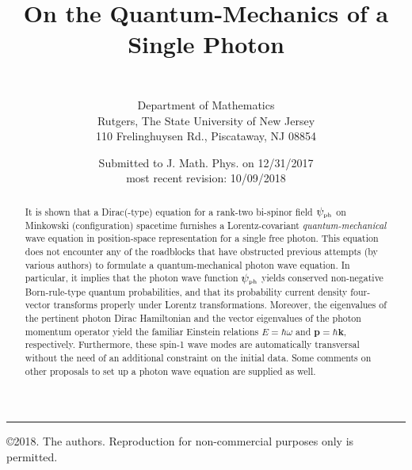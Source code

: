 \documentclass[12pt]{article}
\theoremstyle{definition}
\newcommand{\vect}[1] {\boldsymbol{{ #1}} }
\newcommand{\kV}{{\vect{k}}}		%
\newcommand{\pV}{{\vect{p}}}            %
\numberwithin{equation}{section}
\newcommand{\psiPH}{{\psi_{\mbox{\rm\tiny ph}}}}
\begin{document}
\title{On the Quantum-Mechanics of a Single Photon}

\author{\normalsize{}\\
	{$\phantom{nix}$}\\[-0.1cm] 
        \normalsize Department of Mathematics\\[-0.1cm]
	Rutgers, The State University of New Jersey\\[-0.1cm]
	110 Frelinghuysen Rd., Piscataway, NJ 08854}
\vspace{-0.3cm}
\date{Submitted to J. Math. Phys. on 12/31/2017\\
 most recent revision: 10/09/2018} %
\maketitle
%
%
%
\begin{abstract}
\noindent
 It is shown that a Dirac(-type) equation for a rank-two bi-spinor field $\psiPH$ on Minkowski (configuration) spacetime
furnishes a Lorentz-covariant \emph{quantum-mechanical} wave equation in position-space representation for a single free photon.
 This equation does not encounter any of the roadblocks that have obstructed previous attempts (by various authors) to formulate 
a {quantum-mechanical} photon wave equation.  
 In particular, it implies that the photon wave function $\psiPH$ yields conserved 
non-negative Born-rule-type quantum probabilities,  
and that its probability current density four-vector transforms properly under Lorentz transformations.
 Moreover, the eigenvalues of the pertinent photon Dirac Hamiltonian and the vector eigenvalues of the photon momentum operator 
yield the familiar Einstein relations $E=\hbar\omega$ and $\pV=\hbar\kV$, respectively. 
 Furthermore, these spin-1 wave modes are automatically transversal without the need of an additional constraint on the initial data.
 Some comments on  other proposals to set up a photon wave equation are supplied as well.
\end{abstract}

\smallskip

\vfill
\hrule
\smallskip
\copyright{2018. The authors. Reproduction for non-commercial purposes only is permitted.}
\end{document}
